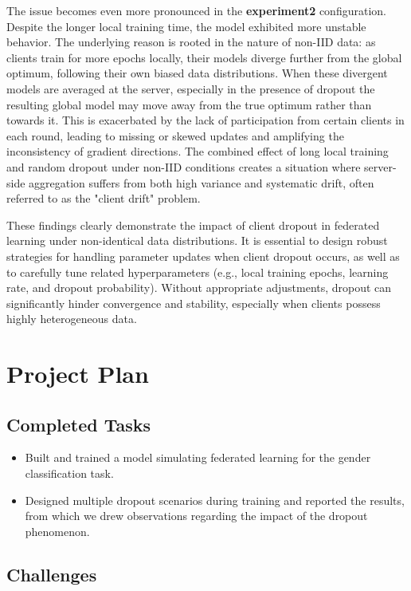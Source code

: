 \documentclass[12pt, a4paper]{article}
\begin{document}
The issue becomes even more pronounced in the \textbf{experiment2} configuration. Despite the longer local training time, the model exhibited more unstable behavior. The underlying reason is rooted in the nature of non-IID data: as clients train for more epochs locally, their models diverge further from the global optimum, following their own biased data distributions. When these divergent models are averaged at the server, especially in the presence of dropout the resulting global model may move away from the true optimum rather than towards it. This is exacerbated by the lack of participation from certain clients in each round, leading to missing or skewed updates and amplifying the inconsistency of gradient directions. The combined effect of long local training and random dropout under non-IID conditions creates a situation where server-side aggregation suffers from both high variance and systematic drift, often referred to as the "client drift" problem.

These findings clearly demonstrate the impact of client dropout in federated learning under non-identical data distributions. It is essential to design robust strategies for handling parameter updates when client dropout occurs, as well as to carefully tune related hyperparameters (e.g., local training epochs, learning rate, and dropout probability). Without appropriate adjustments, dropout can significantly hinder convergence and stability, especially when clients possess highly heterogeneous data.

\section{Project Plan}

\subsection{Completed Tasks}

\begin{itemize}
    \item Built and trained a model simulating federated learning for the gender classification task.
    \item Designed multiple dropout scenarios during training and reported the results, from which we drew observations regarding the impact of the dropout phenomenon.
\end{itemize}

\subsection{Challenges}
\end{document}
